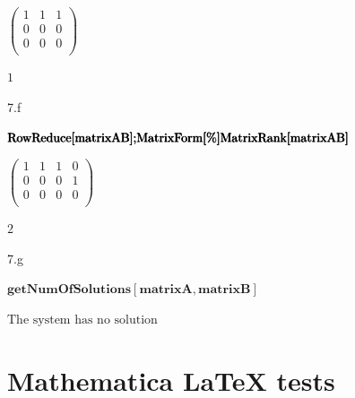 \documentclass[11pt,a4paper]{article}
\begin{document}
\begin{doublespace}
\noindent\(\left(
\begin{array}{ccc}
 1 & 1 & 1 \\
 0 & 0 & 0 \\
 0 & 0 & 0 \\
\end{array}
\right)\)
\end{doublespace}

\begin{doublespace}
\noindent\(1\)
\end{doublespace}

7.f\\
\begin{doublespace}
\noindent\(\pmb{\text{RowReduce}[\text{matrixAB}];}\\
\pmb{\text{MatrixForm}[\%]}\\
\pmb{\text{MatrixRank}[\text{matrixAB}]}\)
\end{doublespace}

\begin{doublespace}
\noindent\(\left(
\begin{array}{cccc}
 1 & 1 & 1 & 0 \\
 0 & 0 & 0 & 1 \\
 0 & 0 & 0 & 0 \\
\end{array}
\right)\)
\end{doublespace}

\begin{doublespace}
\noindent\(2\)
\end{doublespace}


7.g\\
\begin{doublespace}
\noindent\(\pmb{\text{getNumOfSolutions}[\text{matrixA},\text{matrixB}]}\)
\end{doublespace}

\noindent\(\text{The system has no solution}\)

\clearpage
\section{Mathematica LaTeX tests}\label{sec:P08}



\clearpage

\printbibliography

\end{document}
